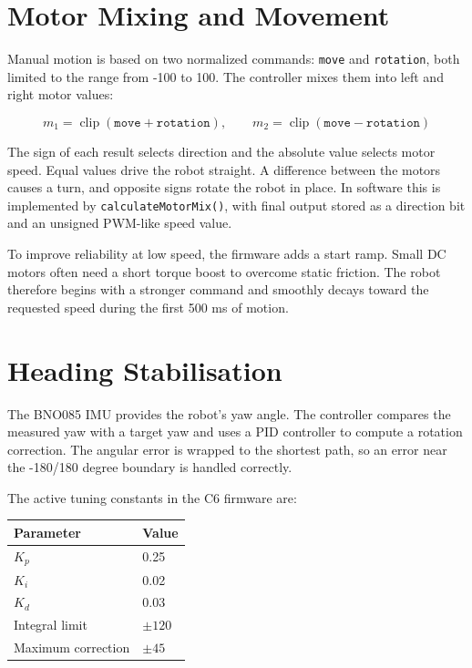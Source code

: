 \documentclass[11pt,a4paper]{article}
\begin{document}
\section{Motor Mixing and Movement}

Manual motion is based on two normalized commands: \texttt{move} and
\texttt{rotation}, both limited to the range from -100 to 100. The controller
mixes them into left and right motor values:

\[
m_1 = \operatorname{clip}(\texttt{move} + \texttt{rotation}), \qquad
m_2 = \operatorname{clip}(\texttt{move} - \texttt{rotation})
\]

The sign of each result selects direction and the absolute value selects motor
speed. Equal values drive the robot straight. A difference between the motors
causes a turn, and opposite signs rotate the robot in place. In software this
is implemented by \texttt{calculateMotorMix()}, with final output stored as a
direction bit and an unsigned PWM-like speed value.

To improve reliability at low speed, the firmware adds a start ramp. Small DC
motors often need a short torque boost to overcome static friction. The robot
therefore begins with a stronger command and smoothly decays toward the
requested speed during the first 500 ms of motion.

\section{Heading Stabilisation}

The BNO085 IMU provides the robot's yaw angle. The controller compares the
measured yaw with a target yaw and uses a PID controller to compute a rotation
correction. The angular error is wrapped to the shortest path, so an error
near the -180/180 degree boundary is handled correctly.

The active tuning constants in the C6 firmware are:

\begin{center}
\begin{tabular}{@{}ll@{}}
\toprule
Parameter & Value \\
\midrule
$K_p$ & 0.25 \\
$K_i$ & 0.02 \\
$K_d$ & 0.03 \\
Integral limit & $\pm 120$ \\
Maximum correction & $\pm 45$ \\
\bottomrule
\end{tabular}
\end{center}
\end{document}
